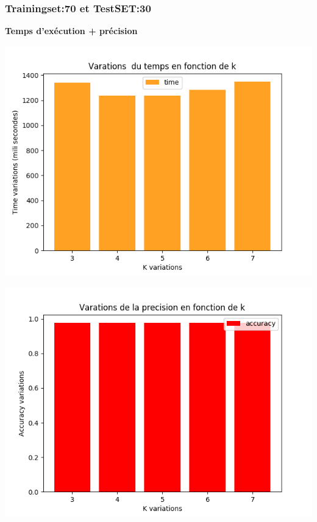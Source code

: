 \documentclass[12pt,a4paper,oneside]{book}
\begin{document}
	
	\subsubsection{Trainingset:70 et TestSET:30}
	\textbf{Temps d'exécution + précision}\\
	\begin{frame}{}
		\centering
		\begin{minipage}[b]{0.5\linewidth}
			\includegraphics[scale=0.5]{image/data2:Train,70,Test,30time.png}
			\label{labelname}%
		\end{minipage}
		\hspace{0.5cm}
		\begin{minipage}[b]{0.5\linewidth}
			\includegraphics[scale=0.5]{image/data2:Train,70,Test,30:accuracy.png}%
			\label{labelname}%
		\end{minipage}
	\end{frame}
	
\end{document}
